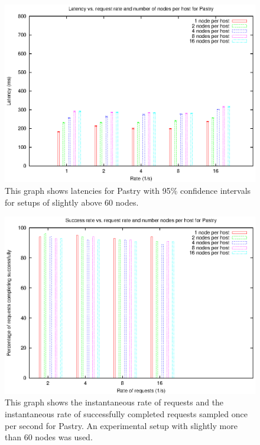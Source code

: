 \begin{figure}[!htbp]
  \begin{center}
    \includegraphics[width=0.9\linewidth]{illustrations/latency_pastry.eps}
    \caption{This graph shows latencies for Pastry with 95\% confidence intervals for setups of slightly above 60 nodes.}
    \label{figPastryLatency}
  \end{center}
\end{figure}

\begin{figure}[!htbp]
  \begin{center}
    \includegraphics[width=0.9\linewidth]{illustrations/success_rate_pastry.eps}
    \caption{This graph shows the instantaneous rate of requests and the instantaneous rate of successfully completed requests sampled once per second for Pastry. An experimental setup with slightly more than 60 nodes was used.}
    \label{figPastrySuccessRate}
  \end{center}
\end{figure}

